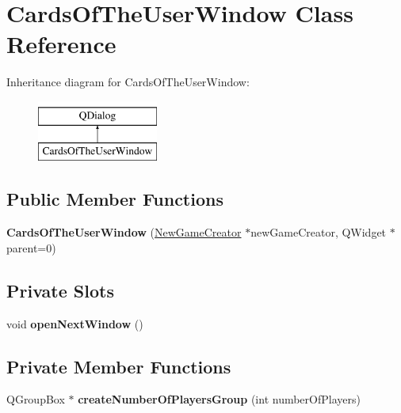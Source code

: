 \hypertarget{classCardsOfTheUserWindow}{}\section{Cards\+Of\+The\+User\+Window Class Reference}
\label{classCardsOfTheUserWindow}
Inheritance diagram for Cards\+Of\+The\+User\+Window\+:\begin{figure}[H]
\begin{center}
\leavevmode
\includegraphics[height=2.000000cm]{classCardsOfTheUserWindow}
\end{center}
\end{figure}
\subsection*{Public Member Functions}
\begin{DoxyCompactItemize}
\item 
\mbox{\label{classCardsOfTheUserWindow_a2196040b2451a78b75855244f7ab52e2}} 
{\bfseries Cards\+Of\+The\+User\+Window} (\hyperlink{classNewGameCreator}{New\+Game\+Creator} $\ast$new\+Game\+Creator, Q\+Widget $\ast$parent=0)
\end{DoxyCompactItemize}
\subsection*{Private Slots}
\begin{DoxyCompactItemize}
\item 
\mbox{\label{classCardsOfTheUserWindow_abb985e8170c8b26c9292aaa4f0aad311}} 
void {\bfseries open\+Next\+Window} ()
\end{DoxyCompactItemize}
\subsection*{Private Member Functions}
\begin{DoxyCompactItemize}
\item 
\mbox{\label{classCardsOfTheUserWindow_aab831ccef68d15b365a5838aa6a04f1e}} 
Q\+Group\+Box $\ast$ {\bfseries create\+Number\+Of\+Players\+Group} (int number\+Of\+Players)
\end{DoxyCompactItemize}
